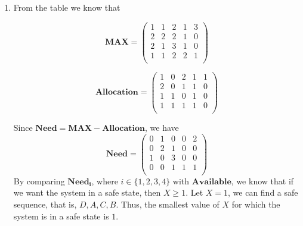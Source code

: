 \documentclass[12pt,a4paper]{article}
\begin{document}
\begin{enumerate}
		\item From the table we know that\\
		\begin{minipage}{0.45\textwidth}
			\centering
			\begin{displaymath}
			\mathbf{MAX} =
			\left( \begin{array}{ccccc}
			1 & 1 & 2 & 1 & 3 \\
			2 & 2 & 2 & 1 & 0 \\
			2 & 1 & 3 & 1 & 0 \\
			1 & 1 & 2 & 2 & 1 \\
			\end{array} \right)
			\end{displaymath}
		\end{minipage}
		\hspace{5mm}
		\begin{minipage}{0.45\textwidth}
			\centering
			\begin{displaymath}
			\mathbf{Allocation} =
			\left( \begin{array}{ccccc}
			1 & 0 & 2 & 1 & 1 \\
			2 & 0 & 1 & 1 & 0 \\
			1 & 1 & 0 & 1 & 0 \\
			1 & 1 & 1 & 1 & 0 \\
			\end{array} \right)
			\end{displaymath}
		\end{minipage}
		Since $\mathbf{Need} = \mathbf{MAX} - \mathbf{Allocation}$, we have 
		\begin{displaymath}
		\mathbf{Need} =
		\left( \begin{array}{ccccc}
		0 & 1 & 0 & 0 & 2 \\
		0 & 2 & 1 & 0 & 0 \\
		1 & 0 & 3 & 0 & 0 \\
		0 & 0 & 1 & 1 & 1 \\
		\end{array} \right)
		\end{displaymath}
		By comparing $\mathbf{Need_i}$, where $i \in \{1,2,3,4\}$ with $\mathbf{Available}$, we know that if we want the system in a safe state, then $X \geq 1$. Let $X = 1$, we can find a safe sequence, that is, $D,A,C,B$. Thus, the smallest value of $X$ for which the system is in a safe state is $1$.
	\end{enumerate}
\end{document}
